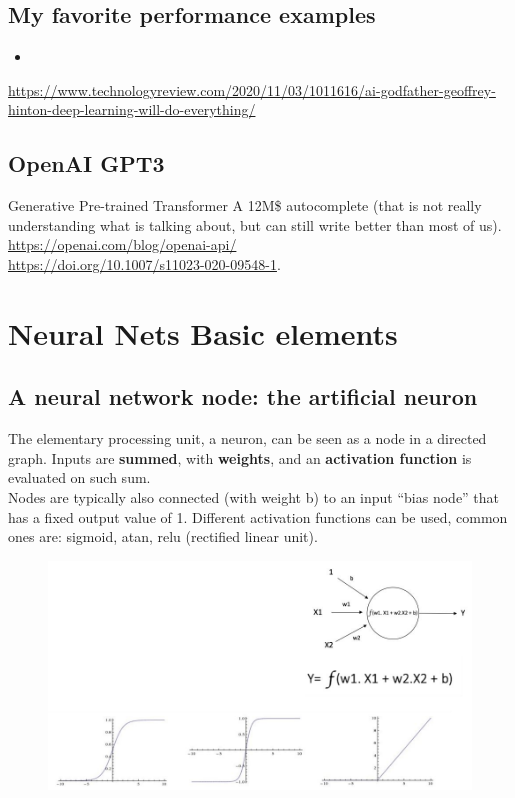 \subsection{My favorite performance examples}

\begin{itemize}
	\item 
\end{itemize}

\url{https://www.technologyreview.com/2020/11/03/1011616/ai-godfather-geoffrey-hinton-deep-learning-will-do-everything/}

\subsection{OpenAI GPT3}

Generative Pre-trained Transformer A 12M\$ autocomplete (that is not really understanding what is talking about, but can still write better than most of us). \url{https://openai.com/blog/openai-api/}\\
\url{https://doi.org/10.1007/s11023-020-09548-1}.
\section{Neural Nets Basic elements}
\subsection{A neural network node: the artificial neuron}
The elementary processing unit, a neuron, can be seen as a node in a directed graph. Inputs are \textbf{summed}, with \textbf{weights}, and an \textbf{activation function} is evaluated on such sum.\\
Nodes are typically also connected (with weight b) to an input “bias node” that has a fixed output value of 1. Different activation functions can be used, common ones are: sigmoid, atan, relu (rectified linear unit).

\begin{figure}[ht]
	\centering
	\includegraphics[width=0.7\linewidth]{figure_ml/neuron.png}
\end{figure}
\FloatBarrier


